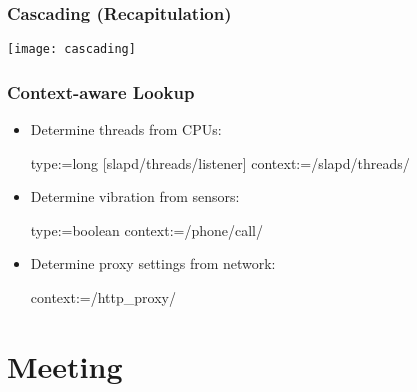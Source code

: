 \begin{frame}
	\frametitle{Cascading (Recapitulation)}
	\texttt{[image: cascading]}
\end{frame}

\begin{frame}[fragile]
	\frametitle{Context-aware Lookup}

	\begin{itemize}
	\item
	Determine threads from CPUs:

	\begin{code}
	  type:=long
	[slapd/threads/listener]
	  context:=/slapd/threads/%
	\end{code}

	\item
	Determine vibration from sensors:

	\begin{code}
	  type:=boolean
	  context:=/phone/call/%
	\end{code}

	\item
	Determine proxy settings from network:

	\begin{code}
	  context:=/http_proxy/%
	\end{code}
	\end{itemize}
\end{frame}




\section{Meeting}



\nocite{raab2017introducing}

\appendix

\begin{frame}[allowframebreaks]
	
	
\end{frame}



